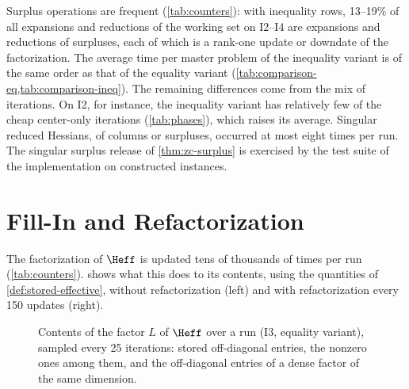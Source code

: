 Surplus operations are frequent (\cref{tab:counters}): with inequality rows, 13--19\% of all
expansions and reductions of the working set on I2--I4 are expansions and reductions of
surpluses, each of which is a rank-one update or downdate of the factorization. The average
time per master problem of the inequality variant is of the same order as that of the equality
variant (\cref{tab:comparison-eq,tab:comparison-ineq}).
The remaining differences come from the mix of iterations. On I2, for instance, the inequality
variant has relatively few of the cheap center-only iterations (\cref{tab:phases}), which raises
its average. Singular
reduced Hessians, of columns or surpluses, occurred at most eight times per run. The
singular surplus release of \cref{thm:zc-surplus} is exercised by the test suite of the
implementation on constructed instances.


\section{Fill-In and Refactorization}
\label{sec:results-fill}

The factorization of $\Heff$ is updated tens of thousands of times per run
(\cref{tab:counters}).  shows what this does to its contents, using the
quantities of \cref{def:stored-effective}, without refactorization (left) and with
refactorization every 150 updates (right).

\begin{figure}[ht]
\centering
{}
\caption{Contents of the factor $L$ of $\Heff$ over a run (I3, equality variant), sampled
every 25 iterations: stored off-diagonal entries, the nonzero ones among them, and the
off-diagonal entries of a dense factor of the same dimension.}
\label{fig:fill}
\end{figure}

